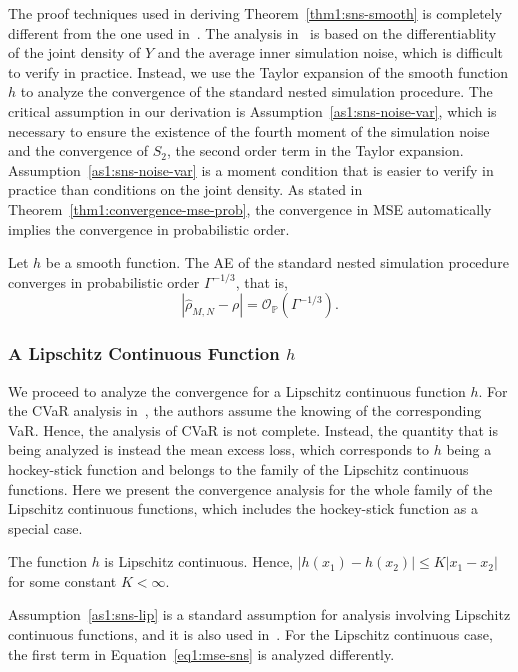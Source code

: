 The proof techniques used in deriving Theorem~\ref{thm1:sns-smooth} is completely different from the one used in~\cite{gordy2010nested}.
The analysis in~\cite{gordy2010nested} is based on the differentiablity of the joint density of $Y$ and the average inner simulation noise, which is difficult to verify in practice.
Instead, we use the Taylor expansion of the smooth function $h$ to analyze the convergence of the standard nested simulation procedure.
The critical assumption in our derivation is Assumption~\ref{as1:sns-noise-var}, which is necessary to ensure the existence of the fourth moment of the simulation noise and the convergence of $S_2$, the second order term in the Taylor expansion.
Assumption~\ref{as1:sns-noise-var} is a moment condition that is easier to verify in practice than conditions on the joint density.
As stated in Theorem~\ref{thm1:convergence-mse-prob}, the convergence in MSE automatically implies the convergence in probabilistic order.

\begin{corollary}
    Let $h$ be a smooth function. 
    The AE of the standard nested simulation procedure converges in probabilistic order $\Gamma^{-1/3}$, that is,
    $$\left| \hat{\rho}_{M, N} - \rho \right| = \mathcal{O}_\mathbb{P}(\Gamma^{-1/3}).$$
\end{corollary}

\subsubsection*{A Lipschitz Continuous Function $h$}
We proceed to analyze the convergence for a Lipschitz continuous function $h$.
For the CVaR analysis in~\cite{gordy2010nested}, the authors assume the knowing of the corresponding VaR.
Hence, the analysis of CVaR is not complete.
Instead, the quantity that is being analyzed is instead the mean excess loss, which corresponds to $h$ being a hockey-stick function and belongs to the family of the Lipschitz continuous functions. 
Here we present the convergence analysis for the whole family of the Lipschitz continuous functions, which includes the hockey-stick function as a special case. 

\begin{assumption} \label{as1:sns-lip}
    The function $h$ is Lipschitz continuous. Hence, $|h(x_1) - h(x_2)| \leq K|x_1 - x_2|$ for some constant $K< \infty$.
\end{assumption}
Assumption~\ref{as1:sns-lip} is a standard assumption for analysis involving Lipschitz continuous functions, and it is also used in~\cite{broadie2015risk}.
For the Lipschitz continuous case, the first term in Equation~\ref{eq1:mse-sns} is analyzed differently.

